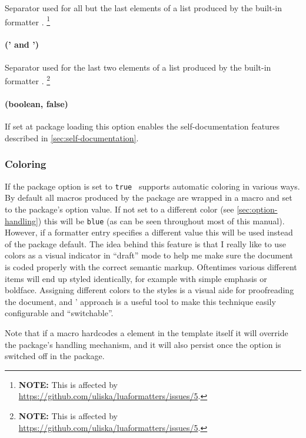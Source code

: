 \documentclass[12pt]{scrartcl}
\begin{document}
Separator used for all but the last elements of a list produced by the built-in formatter
.%
\footnote{\textbf{NOTE:} This is affected by
\url{https://github.com/uliska/luaformatters/issues/5}.}


\paragraph{ (' and ')}

Separator used for the last two elements of a list produced by the built-in formatter
.%
\footnote{\textbf{NOTE:} This is affected by
\url{https://github.com/uliska/luaformatters/issues/5}.}


\paragraph{ (boolean, false)}

If set at package loading this option enables the self-documentation features
described in \vref{sec:self-documentation}.


\subsubsection{Coloring}
\label{sec:coloring}

If the package option  is set to \texttt{true}
\luaformatters\ supports automatic coloring in various ways.  By default
all macros produced by the package are wrapped in a  macro and
set to the package's  option value.  If not set to a
different color (see \vref{sec:option-handling}) this will be \texttt{blue}
(as can be seen throughout most of this manual).  However, if a formatter entry
specifies a different  value this will be used instead of the
package default.  The idea behind this feature is that I really like to use
colors as a visual indicator in “draft” mode to help me make sure the document
is coded properly with the correct semantic markup.  Oftentimes various
different items will end up styled identically, for example with simple emphasis
or boldface.  Assigning different colors to the styles is a visual aide for
proofreading the document, and \luaformatters' approach is a useful tool
to make this technique easily configurable and “switchable”.

Note that if a macro hardcodes a  element in the template itself
it will override the package's handling mechanism, and it will also persist once
the  option is switched off in the package.
\end{document}
